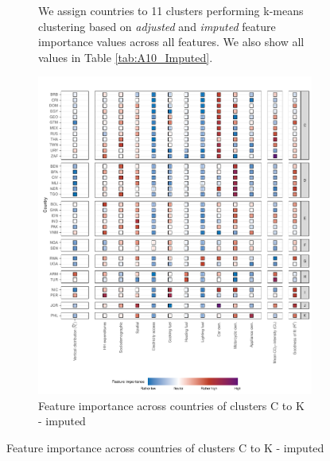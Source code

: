 \begin{figure}[ht!]
\begin{subfigure}[b]{\textwidth}
\begin{subcaption2}
    We assign countries to 11 clusters performing k-means clustering based on \textit{adjusted} and \textit{imputed} feature importance values across all features. We also show all values in Table \ref{tab:A10_Imputed}.
    \end{subcaption2}
    \end{subfigure}
    
\end{figure}
\clearpage

\clearpage
\begin{figure}[ht!]\ContinuedFloat
    \centering
    \begin{subfigure}[b]{\textwidth}
    \centering
    \caption{Feature importance across countries of clusters C to K - imputed}\label{fig:fig_4_2_imputed}
    \includegraphics{Figure 4/Figure_4_Corrected_Imputed_2.pdf}
    \begin{subcaption2}

\end{subcaption2}
\end{subfigure}
\end{figure}
